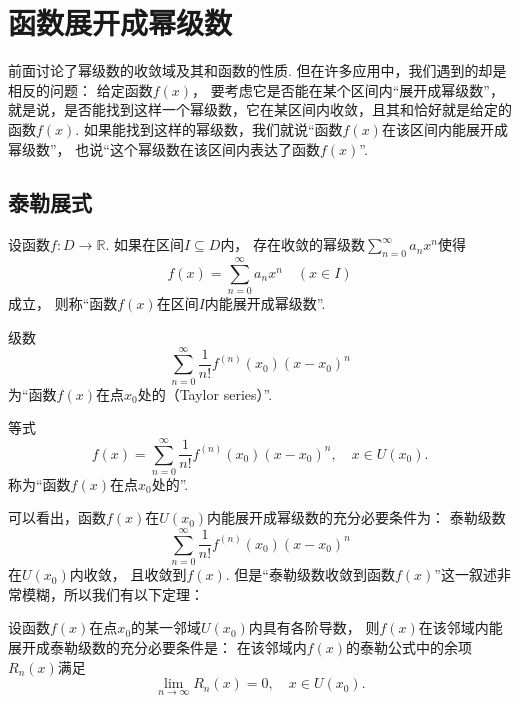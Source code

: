 \section{函数展开成幂级数}
前面讨论了幂级数的收敛域及其和函数的性质.
但在许多应用中，我们遇到的却是相反的问题：
给定函数\(f(x)\)，
要考虑它是否能在某个区间内“展开成幂级数”，
就是说，是否能找到这样一个幂级数，它在某区间内收敛，且其和恰好就是给定的函数\(f(x)\).
如果能找到这样的幂级数，我们就说“函数\(f(x)\)在该区间内能展开成幂级数”，
也说“这个幂级数在该区间内表达了函数\(f(x)\)”.

\subsection{泰勒展式}
\begin{definition}
设函数\(f\colon D\to\mathbb{R}\).
如果在区间\(I \subseteq D\)内，
存在收敛的幂级数\(\sum_{n=0}^\infty a_n x^n\)使得\begin{equation*}
	f(x) = \sum_{n=0}^\infty a_n x^n
	\quad(x \in I)
\end{equation*}成立，
则称“函数\(f(x)\)在区间\(I\)内能展开成幂级数”.
\end{definition}

\begin{definition}
级数\begin{equation*}
	\sum_{n=0}^\infty \frac{1}{n!} f^{(n)}(x_0) (x-x_0)^n
\end{equation*}
为“函数\(f(x)\)在点\(x_0\)处的（Taylor series）”.

等式\begin{equation*}
	f(x) = \sum_{n=0}^\infty {\frac{1}{n!} f^{(n)}(x_0) (x-x_0)^n},
	\quad x \in U(x_0).
\end{equation*}
称为“函数\(f(x)\)在点\(x_0\)处的”.
\end{definition}

可以看出，函数\(f(x)\)在\(U(x_0)\)内能展开成幂级数的充分必要条件为：
泰勒级数\begin{equation*}
	\sum_{n=0}^\infty {\frac{1}{n!} f^{(n)}(x_0) (x-x_0)^n}
\end{equation*}在\(U(x_0)\)内收敛，
且收敛到\(f(x)\).
但是“泰勒级数收敛到函数\(f(x)\)”这一叙述非常模糊，所以我们有以下定理：
\begin{theorem}
设函数\(f(x)\)在点\(x_0\)的某一邻域\(U(x_0)\)内具有各阶导数，
则\(f(x)\)在该邻域内能展开成泰勒级数的充分必要条件是：
在该邻域内\(f(x)\)的泰勒公式中的余项\(R_n(x)\)满足\begin{equation*}
	\lim_{n\to\infty} R_n(x) = 0,
	\quad x \in U(x_0).
\end{equation*}
\end{theorem}

